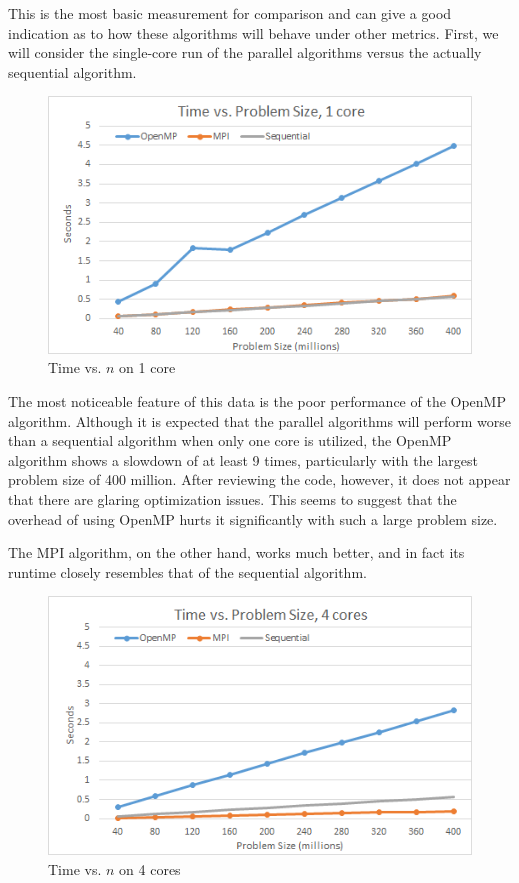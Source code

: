 \documentclass{article}
\begin{document}
This is the most basic measurement for comparison and can give a good indication as to how these algorithms will behave under other metrics.  First, we will consider the single-core run of the parallel algorithms versus the actually sequential algorithm.

\begin{figure}[H]
	\centering

	\includegraphics[width=1.0\textwidth]{figures/tvn_1.png}

	\caption{Time vs. $n$ on 1 core}
\end{figure}

The most noticeable feature of this data is the poor performance of the OpenMP algorithm.  Although it is expected that the parallel algorithms will perform worse than a sequential algorithm when only one core is utilized, the OpenMP algorithm shows a slowdown of at least 9 times, particularly with the largest problem size of 400 million.  After reviewing the code, however, it does not appear that there are glaring optimization issues.  This seems to suggest that the overhead of using OpenMP hurts it significantly with such a large problem size.

The MPI algorithm, on the other hand, works much better, and in fact its runtime closely resembles that of the sequential algorithm.

\begin{figure}[H]
	\centering

	\includegraphics[width=1.0\textwidth]{figures/tvn_4.png}

	\caption{Time vs. $n$ on 4 cores}
\end{figure}
\end{document}
